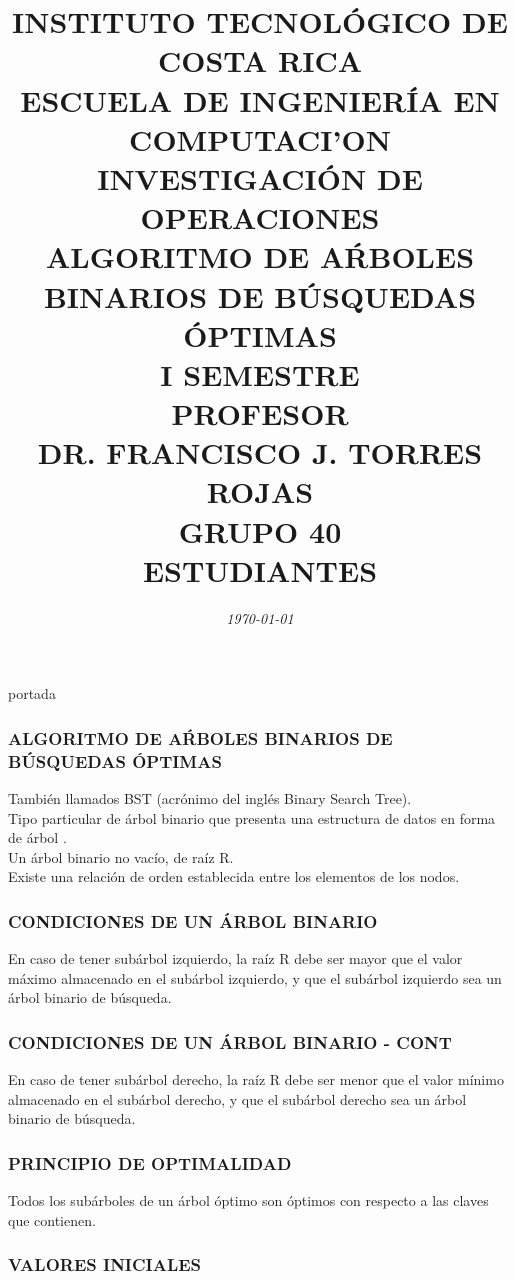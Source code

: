 \documentclass[10]{beamer}
\title{{\color{WHITE} \large \textbf{INSTITUTO TECNOL\'OGICO DE COSTA RICA}} \\ \vspace{0.02cm} 
{\color{WHITE} \large \textbf{ESCUELA DE INGENIER\'IA EN COMPUTACI'ON }} \\ \vspace{0.02cm} 
{\color{WHITE} \large \textbf{INVESTIGACI\'ON DE OPERACIONES  }} \\ \vspace{0.02cm} 
{\color{WHITE} \large \textbf{ALGORITMO DE A\'RBOLES BINARIOS DE B\'USQUEDAS \'OPTIMAS  }} \\ \vspace{0.02cm} 
{\color{WHITE} \large \textbf{I SEMESTRE  }}\\ \vspace{0.02cm}
{\color{WHITE} \large \textbf{PROFESOR}} \\ \vspace{0.02cm}
{\color{WHITE} \large DR. FRANCISCO J. TORRES ROJAS  } \\ \vspace{0.02cm}
{\color{WHITE} \large \textbf{GRUPO 40}} \\ \vspace{0.01cm}
{\color{WHITE} \large \textbf{ESTUDIANTES} }}
\date{\em \color{WHITE} \today}
\begin{document}
\begin{frame}
\color{white}
\titlepage portada
\end{frame} 
\begin{frame}
\color{white}
\frametitle{ALGORITMO DE A\'RBOLES BINARIOS DE B\'USQUEDAS \'OPTIMAS}
Tambi\'en llamados BST (acr\'onimo del ingl\'es Binary Search Tree).
\\ Tipo particular de \'arbol binario que presenta una estructura de datos en forma de \'arbol .
\\Un \'arbol binario no vac\'io, de ra\'iz R.
\\ Existe una relaci\'on de orden establecida entre los elementos de los nodos.
\end{frame} 
\begin{frame}
\color{white}
\frametitle{CONDICIONES DE UN \'ARBOL BINARIO}
En caso de tener sub\'arbol izquierdo, la ra\'iz R debe ser mayor que el valor m\'aximo almacenado en el sub\'arbol izquierdo, y que el sub\'arbol izquierdo sea un \'arbol binario de b\'usqueda.
\end{frame} 
\begin{frame}
\color{white}
\frametitle{CONDICIONES DE UN \'ARBOL BINARIO - CONT}
En caso de tener sub\'arbol derecho, la ra\'iz R debe ser menor que el valor m\'inimo almacenado en el sub\'arbol derecho, y que el sub\'arbol derecho sea un \'arbol binario de b\'usqueda.
\end{frame} 
\begin{frame}
\color{white}
\frametitle{PRINCIPIO DE OPTIMALIDAD}
Todos los sub\'arboles de un \'arbol \'optimo son \'optimos con respecto a las claves que contienen.
\end{frame} 
\begin{frame}\frametitle{VALORES INICIALES}
 \color{white}
\end{frame} 
\end{document}
